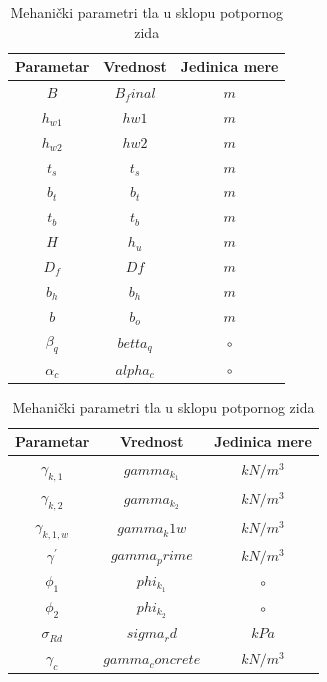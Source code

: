 \documentclass[a4paper, 11pt]{article}
\begin{document}
\begin{table}[h]
\centering
\begin{minipage}{0.40\textwidth}
\centering
\begin{tabular}{|c|c|c|}
\hline
Parametar & Vrednost & Jedinica mere \\
\hline
$B$ & $B_final$ & $m$ \\
\hline
$h_{w1}$ & $hw1$ & $m$ \\
\hline
$h_{w2}$ & $hw2$ & $m$ \\
\hline
$t_{s}$ & $t_s$ & $m$ \\
\hline
$b_{t}$ & $b_t$ & $m$ \\
\hline
$t_{b}$ & $t_b$ & $m$ \\
\hline
$H$ & $h_u$ & $m$ \\
\hline
$D_{f}$ & $Df$ & $m$ \\
\hline
$b_{h}$ & $b_h$ & $m$ \\
\hline
$b$ & $b_o$ & $m$ \\
\hline
$\beta_{q}$ & $betta_q$ & $\circ$\\
\hline
$\alpha_{c}$ & $alpha_c$ & $\circ$\\
\hline
\end{tabular}
\caption{Geometrijiski parametri potpornog zida}
\label{tab:geometrijiski_parametri}
\end{minipage}
\hfill
\begin{minipage}{0.40\textwidth}
\centering
\begin{tabular}{|c|c|c|}
\hline
Parametar & Vrednost & Jedinica mere \\
\hline
$\gamma_{k,1}$ & $gamma_k_1$ & $kN/m^3$ \\
\hline
$\gamma_{k,2}$ & $gamma_k_2$ & $kN/m^3$ \\
\hline
$\gamma_{k,1,w}$ & $gamma_k1w$ & $kN/m^3$ \\
\hline
$\gamma^{'}$ & $gamma_prime$ & $kN/m^3$ \\
\hline
$\phi_{1}$ & $phi_k_1$ & $\circ$ \\
\hline
$\phi_{2}$ & $phi_k_2$ & $\circ$ \\
\hline
$\sigma_{Rd}$ & $sigma_rd$ & $kPa$ \\
\hline
$\gamma_{c}$ & $gamma_concrete $ & $kN/m^3$ \\
\hline
\end{tabular}
\caption{Mehani\v{c}ki parametri tla u sklopu potpornog zida}
\label{tab:mehanicki_parametri}
\end{minipage}
\end{table}
\end{document}
